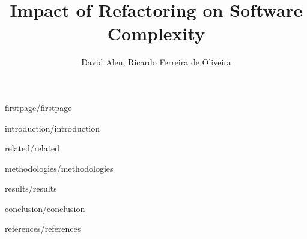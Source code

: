 \documentclass[12pt]{article}
\title{Impact of Refactoring on Software Complexity}
\author{David Alen\inst{1}, Ricardo Ferreira de Oliveira\inst{1}}
\begin{document}
{firstpage/firstpage}

{introduction/introduction}

{related/related}

{methodologies/methodologies}

{results/results}

{conclusion/conclusion}

{references/references}
\end{document}
